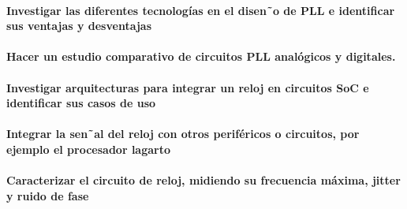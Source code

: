 \documentclass[runningheads,a4paper]{llncs}
\begin{document}
\paragraph{Investigar las diferentes tecnologías en el disen˜o de PLL e identificar sus ventajas y desventajas}
\paragraph{Hacer un estudio comparativo de circuitos PLL analógicos y digitales.}
\paragraph{Investigar arquitecturas para integrar un reloj en circuitos SoC e identificar sus casos de uso}
\paragraph{Integrar la sen˜al del reloj con otros periféricos o circuitos, por ejemplo el procesador lagarto}
\paragraph{Caracterizar el circuito de reloj, midiendo su frecuencia máxima, jitter y ruido de fase}
\end{document}
